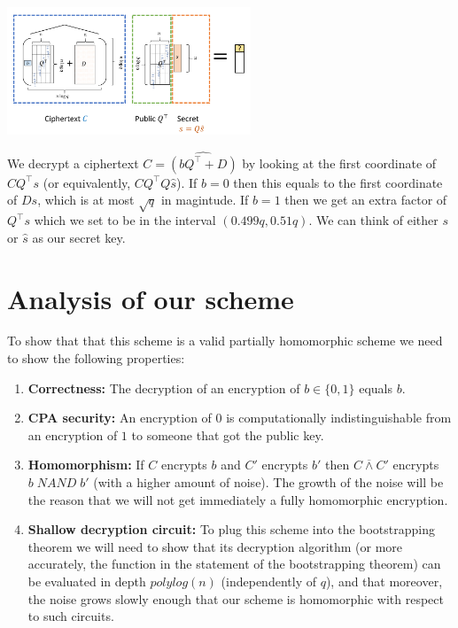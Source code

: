 \begin{marginfigure}
\centering
\includegraphics[width=\linewidth, height=1.5in, keepaspectratio]{../figure/fhedec.png}
\caption{We decrypt a ciphertext \(C=\widehat{(bQ^\top +D)}\) by looking
at the first coordinate of \(\ensuremath{\mathit{CQ}}^\top s\) (or
equivalently, \(\ensuremath{\mathit{CQ}}^\top Q\hat{s}\)). If \(b=0\)
then this equals to the first coordinate of \(Ds\), which is at most
\(\sqrt{q}\) in magintude. If \(b=1\) then we get an extra factor of
\(Q^\top s\) which we set to be in the interval \((0.499q,0.51q)\). We
can think of either \(s\) or \(\hat{s}\) as our secret key.}
\label{fhedecfig}
\end{marginfigure}

\section{Analysis of our scheme}\label{Analysis-of-our-scheme}

To show that that this scheme is a valid partially homomorphic scheme we
need to show the following properties:

\begin{enumerate}
\def\labelenumi{\arabic{enumi}.}
\item
  \textbf{Correctness:} The decryption of an encryption of
  \(b\in\{0,1\}\) equals \(b\).
\item
  \textbf{CPA security:} An encryption of \(0\) is computationally
  indistinguishable from an encryption of \(1\) to someone that got the
  public key.
\item
  \textbf{Homomorphism:} If \(C\) encrypts \(b\) and \(C'\) encrypts
  \(b'\) then \(C \overline{\wedge} C'\) encrypts
  \(b\; \ensuremath{\mathit{NAND}}\; b'\) (with a higher amount of
  noise). The growth of the noise will be the reason that we will not
  get immediately a fully homomorphic encryption.
\item
  \textbf{Shallow decryption circuit:} To plug this scheme into the
  bootstrapping theorem we will need to show that its decryption
  algorithm (or more accurately, the function in the statement of the
  bootstrapping theorem) can be evaluated in depth \(polylog(n)\)
  (independently of \(q\)), and that moreover, the noise grows slowly
  enough that our scheme is homomorphic with respect to such circuits.
\end{enumerate}

